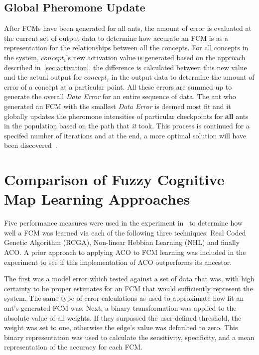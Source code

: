 \documentclass{umm-senior-sem}
\begin{document}
\subsection{Global Pheromone Update}
\label{sec:global}
After FCMs have been generated for all ants, the amount of error is evaluated at the current set of output data to determine how accurate an FCM is as a representation for the relationships between all the concepts. For all concepts in the system, $concept_i$'s new activation value is generated based on the approach described in~\ref{sec:activation}, the difference is calculated between this new value and the actual output for $concept_i$ in the output data to determine the amount of error of a concept at a particular point. All these errors are summed up to generate the overall \textit{Data Error} for an entire sequence of data. The ant who generated an FCM with the smallest \textit{Data Error} is deemed most fit and it globally updates the pheromone intensities of particular checkpoints for \textbf{all} ants in the population based on the path that \textit{it} took. This process is continued for a specifed number of iterations and at the end, a more optimal solution will have been discovered~\cite{main:2012}.

\section{Comparison of Fuzzy Cognitive Map Learning Approaches}
\label{sec:comparison}
Five performance measures were used in the experiment in~\cite{main:2012} to determine how well a FCM was learned via each of the following three techniques: Real Coded Genetic Algorithm (RCGA), Non-linear Hebbian Learning (NHL) and finally ACO. A prior approach to applying ACO to FCM learning was included in the experiment to see if this implementation of ACO outperforms its ancestor.

The first was a model error which tested against a set of data that was, with high certainty to be proper estimates for an FCM that would sufficiently represent the system. The same type of error calculations as used to approximate how fit an ant's generated FCM was. Next, a binary transformation was applied to the absolute value of all weights. If they surpassed the user-defined threshold, the weight was set to one, otherwise the edge's value was defaulted to zero. This binary representation was used to calculate the sensitivity, specificity, and a mean representation of the accuracy for each FCM. 
\end{document}
